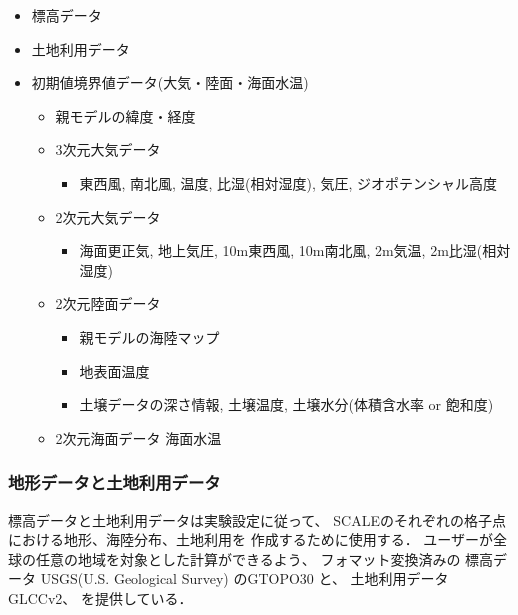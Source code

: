 \begin{itemize}
\item {\color{blue}標高データ}
\item {\color{blue}土地利用データ}
\item 初期値境界値データ(大気・陸面・海面水温)
 \begin{itemize}
   \item {\color{blue}親モデルの緯度・経度}
   \item 3次元大気データ
     \begin{itemize}
       \item {\color{blue}東西風, 南北風, 温度, 比湿(相対湿度), 気圧, ジオポテンシャル高度}
     \end{itemize}
   \item 2次元大気データ
     \begin{itemize}
       \item 海面更正気, 地上気圧, 10m東西風, 10m南北風, 2m気温, 2m比湿(相対湿度)
     \end{itemize}
   \item 2次元陸面データ
     \begin{itemize}
       \item 親モデルの海陸マップ
       \item {\color{blue}地表面温度}
       \item {\color{blue}土壌データの深さ情報, 土壌温度}, 土壌水分(体積含水率 or 飽和度)
     \end{itemize}
   \item 2次元海面データ 海面水温
 \end{itemize}
\end{itemize}


\subsubsection{地形データと土地利用データ}
標高データと土地利用データは実験設定に従って、
SCALEのそれぞれの格子点における地形、海陸分布、土地利用を
作成するために使用する．
ユーザーが全球の任意の地域を対象とした計算ができるよう、
フォマット変換済みの
標高データ USGS(U.S. Geological Survey) のGTOPO30 と、
土地利用データ GLCCv2、
を提供している．

